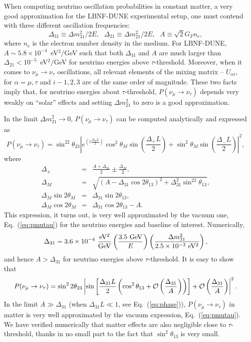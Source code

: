 \documentclass[aps,prd,onecolumn,nofootinbib,superscriptaddress, 11pt]{revtex4}
\begin{document}
When computing neutrino oscillation probabilities in constant matter, a very good approximation for the LBNF-DUNE experimental setup, one must contend with three different oscillation frequencies: 
\begin{equation}
\Delta_{31}\equiv\Delta m^2_{31}/2E, ~~~ \Delta_{21}\equiv\Delta m^2_{21}/2E, ~~~ A\equiv\sqrt{2}G_Fn_e, 
\end{equation}
where $n_e$ is the electron number density in the medium. For LBNF-DUNE, $A\sim 5.8\times 10^{-4}$~eV$^2/$GeV such that both $\Delta_{31}$ and $A$ are much larger than $\Delta_{21}<10^{-5}$~eV$^2/$GeV for neutrino energies above $\tau$-threshold. Moreover, when it comes to $\nu_{\mu}\to\nu_{\tau}$ oscillations, all relevant elements of the mixing matrix -- $U_{\alpha i}$, for $\alpha=\mu,\tau$ and $i-1,2,3$ are of the same order of magnitude. These two facts imply that, for neutrino energies about $\tau$-threshold, $P(\nu_{\mu}\to\nu_{\tau})$ depends very weakly on ``solar'' effects and setting  $\Delta m^2_{21}$ to zero is a good approximation. 

In the limit $\Delta m^2_{21}\to 0$, $P(\nu_{\mu}\to\nu_{\tau})$ can be computed analytically and expressed as
\begin{equation}
P(\nu_{\mu}\to\nu_{\tau}) =  \sin^22\theta_{23}\left|e^{\left(i\frac{\Delta_ML}{2}\right)}\cos^2\theta_M\sin\left(\frac{\Delta_+L}{2}\right)+\sin^2\theta_M\sin\left(\frac{\Delta_-L}{2}\right)\right|^2,
\end{equation}
where
\begin{eqnarray}
\Delta_{\pm}&=&\frac{A+\Delta_{31}}{2}\pm\frac{\Delta_M}{2}, \\
\Delta_M&=&\sqrt{\left(A-\Delta_{31}\cos2\theta_{13}\right)^2+\Delta_{31}^2\sin^22\theta_{13}}, \\
\Delta_M\sin2\theta_{M}&=&\Delta_{31}\sin2\theta_{13}, \\
\Delta_M\cos2\theta_{M}&=&\Delta_{31}\cos2\theta_{13}-A.
\end{eqnarray}
This expression, it turns out, is very well approximated by the vacuum one, Eq.~(\ref{eq:pmutau}) for the neutrino energies and baseline of interest. Numerically, 
\begin{equation}
\Delta_{31}=3.6\times 10^{-4}~\frac{\rm eV^2}{\rm GeV}\left(\frac{3.5~\rm GeV}{E}\right)\left(\frac{\Delta m^2_{31}}{2.5\times 10^{-3}~\rm eV^2}\right),
\end{equation}
and hence $A>\Delta_{31}$ for neutrino energies above $\tau$-threshold. It is easy to show that
\begin{equation}
P(\nu_{\mu}\to\nu_{\tau})=\sin^22\theta_{23}\left|\sin\left[\frac{\Delta_{31}L}{2}\left(\cos^2\theta_{13}+{\cal O}\left(\frac{\Delta_{31}}{A}\right)\right)\right]+{\cal O}\left(\frac{\Delta_{31}}{A}\right)\right|^2.
\end{equation}
In the limit $A\gg \Delta_{31}$ (when $\Delta_{31}L\ll 1$, see Eq.~(\ref{eq:phase})), $P(\nu_{\mu}\to\nu_{\tau})$ in matter is very well approximated by the vacuum expression, Eq.~(\ref{eq:pmutau}). We have verified numerically that matter effects are also negligible close to $\tau$-threshold, thanks in no small part to the fact that $\sin^2\theta_{13}$ is very small.
\end{document}
